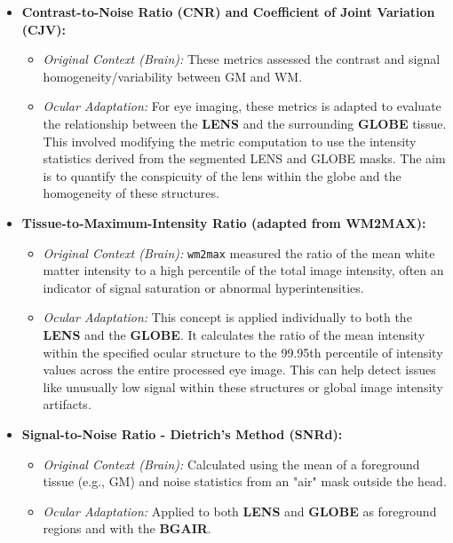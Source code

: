 \begin{itemize}
    \item \textbf{Contrast-to-Noise Ratio (CNR) and Coefficient of Joint Variation (CJV):}
        \begin{itemize}
            \item \textit{Original Context (Brain):} These metrics assessed the contrast and signal homogeneity/variability between GM and WM.
            \item \textit{Ocular Adaptation:} For eye imaging, these metrics is adapted to evaluate the relationship between the \textbf{LENS} and the surrounding \textbf{GLOBE} tissue. This involved modifying the metric computation to use the intensity statistics derived from the segmented LENS and GLOBE masks. The aim is to quantify the conspicuity of the lens within the globe and the homogeneity of these structures.
        \end{itemize}

    \item \textbf{Tissue-to-Maximum-Intensity Ratio (adapted from WM2MAX):}
        \begin{itemize}
            \item \textit{Original Context (Brain):} \texttt{wm2max} measured the ratio of the mean white matter intensity to a high percentile of the total image intensity, often an indicator of signal saturation or abnormal hyperintensities.
            \item \textit{Ocular Adaptation:} This concept is applied individually to both the \textbf{LENS} and the \textbf{GLOBE}. It calculates the ratio of the mean intensity within the specified ocular structure to the 99.95th percentile of intensity values across the entire processed eye image. This can help detect issues like unusually low signal within these structures or global image intensity artifacts.
        \end{itemize}
    
    \item \textbf{Signal-to-Noise Ratio - Dietrich's Method (SNRd):}
        \begin{itemize}
            \item \textit{Original Context (Brain):} Calculated using the mean of a foreground tissue (e.g., GM) and noise statistics from an "air" mask outside the head.
            \item \textit{Ocular Adaptation:} Applied to both \textbf{LENS} and \textbf{GLOBE} as foreground regions and with the \textbf{BGAIR}. 
        \end{itemize}


\end{itemize}
